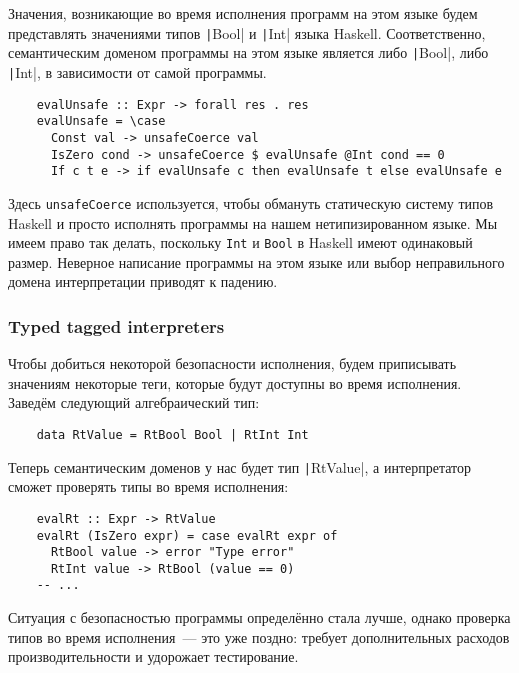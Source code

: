 Значения, возникающие во время исполнения программ на этом языке будем представлять значениями типов \texttt|Bool| и \texttt|Int| языка Haskell. %
Соответственно, семантическим доменом программы на этом языке является либо \texttt|Bool|, либо \texttt|Int|, в зависимости от самой программы.
\begin{verbatim}
    evalUnsafe :: Expr -> forall res . res
    evalUnsafe = \case
      Const val -> unsafeCoerce val
      IsZero cond -> unsafeCoerce $ evalUnsafe @Int cond == 0
      If c t e -> if evalUnsafe c then evalUnsafe t else evalUnsafe e
\end{verbatim}

Здесь \texttt{unsafeCoerce} используется, чтобы обмануть статическую систему типов Haskell и просто исполнять программы на нашем нетипизированном языке.
Мы имеем право так делать, поскольку \texttt{Int} и \texttt{Bool} в Haskell имеют одинаковый размер.
Неверное написание программы на этом языке или выбор неправильного домена интерпретации приводят к падению.

\subsubsection{Typed tagged interpreters}

Чтобы добиться некоторой безопасности исполнения, будем приписывать значениям некоторые теги, которые будут доступны во время исполнения.
Заведём следующий алгебраический тип:
\begin{verbatim}
    data RtValue = RtBool Bool | RtInt Int
\end{verbatim}

Теперь семантическим доменов у нас будет тип \texttt|RtValue|, а интерпретатор сможет проверять типы во время исполнения:
\begin{verbatim}
    evalRt :: Expr -> RtValue
    evalRt (IsZero expr) = case evalRt expr of
      RtBool value -> error "Type error"
      RtInt value -> RtBool (value == 0)
    -- ...
\end{verbatim}

Ситуация с безопасностью программы определённо стала лучше, однако проверка типов во время исполнения~--- это уже поздно: требует дополнительных расходов производительности и удорожает тестирование.


